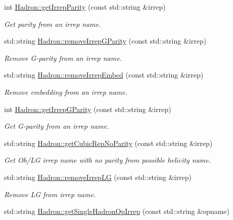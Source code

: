 \begin{DoxyCompactItemize}
int \mbox{\hyperlink{namespaceHadron_af182dccf3462f82247a3d86df38c2da0}{Hadron\+::get\+Irrep\+Parity}} (const std\+::string \&irrep)
\begin{DoxyCompactList}\small\item\em Get parity from an irrep name. \end{DoxyCompactList}\item 
std\+::string \mbox{\hyperlink{namespaceHadron_a6c2109897dff664c15b3fe81aa7d8917}{Hadron\+::remove\+Irrep\+G\+Parity}} (const std\+::string \&irrep)
\begin{DoxyCompactList}\small\item\em Remove G-\/parity from an irrep name. \end{DoxyCompactList}\item 
std\+::string \mbox{\hyperlink{namespaceHadron_a828226a1b80591d5791be7e1bc155220}{Hadron\+::remove\+Irrep\+Embed}} (const std\+::string \&irrep)
\begin{DoxyCompactList}\small\item\em Remove embedding from an irrep name. \end{DoxyCompactList}\item 
int \mbox{\hyperlink{namespaceHadron_a951cfb9d3a3b24aaf558d2e22513cec1}{Hadron\+::get\+Irrep\+G\+Parity}} (const std\+::string \&irrep)
\begin{DoxyCompactList}\small\item\em Get G-\/parity from an irrep name. \end{DoxyCompactList}\item 
std\+::string \mbox{\hyperlink{namespaceHadron_a6efae379facc253e72b35cf4d235dc88}{Hadron\+::get\+Cubic\+Rep\+No\+Parity}} (const std\+::string \&irrep)
\begin{DoxyCompactList}\small\item\em Get Oh/\+LG irrep name with no parity from possible helicity name. \end{DoxyCompactList}\item 
std\+::string \mbox{\hyperlink{namespaceHadron_aff55b5fd81ffee95432b7d4e1c8d01e6}{Hadron\+::remove\+Irrep\+LG}} (const std\+::string \&irrep)
\begin{DoxyCompactList}\small\item\em Remove LG from irrep name. \end{DoxyCompactList}\item 
std\+::string \mbox{\hyperlink{namespaceHadron_a9b05418ba46746a99fb402de358096d3}{Hadron\+::get\+Single\+Hadron\+Op\+Irrep}} (const std\+::string \&opname)

\end{DoxyCompactItemize}
